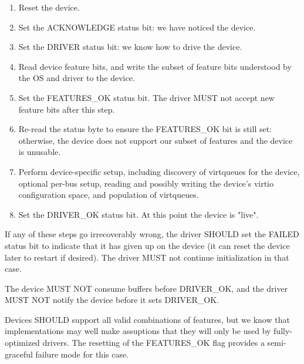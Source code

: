 \begin{enumerate}
\item Reset the device.

\item Set the ACKNOWLEDGE status bit: we have noticed the device.

\item Set the DRIVER status bit: we know how to drive the device.

\item Read device feature bits, and write the subset of feature bits
   understood by the OS and driver to the device.

\item\label{itm:General Initialization And Device Operation / Device Initialization / Set FEATURES-OK} Set the FEATURES_OK status bit.  The driver MUST not accept
   new feature bits after this step.

\item\label{itm:General Initialization And Device Operation / Device Initialization / Re-read FEATURES-OK} Re-read the status byte to ensure the FEATURES_OK bit is still
   set: otherwise, the device does not support our subset of features
   and the device is unusable.

\item\label{itm:General Initialization And Device Operation / Device Initialization / Device-specific Setup} Perform device-specific setup, including discovery of virtqueues for the
   device, optional per-bus setup, reading and possibly writing the
   device's virtio configuration space, and population of virtqueues.

\item\label{itm:General Initialization And Device Operation / Device Initialization / Set DRIVER-OK} Set the DRIVER_OK status bit.  At this point the device is
   "live".
\end{enumerate}

If any of these steps go irrecoverably wrong, the driver SHOULD
set the FAILED status bit to indicate that it has given up on the
device (it can reset the device later to restart if desired).  The
driver MUST not continue initialization in that case.

The device MUST NOT consume buffers before DRIVER_OK, and the driver
MUST NOT notify the device before it sets DRIVER_OK.

Devices SHOULD support all valid combinations of features, but we know
that implementations may well make assuptions that they will only be
used by fully-optimized drivers.  The resetting of the FEATURES_OK flag
provides a semi-graceful failure mode for this case.

